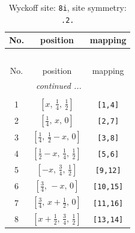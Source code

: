 \documentclass[fleqn,8pt]{jsarticle}
\begin{document}
\begin{longtable}{ccc}
\caption{Wyckoff site: {\tt 8i}, site symmetry: {\tt .2.}}
 \\
 \hline \hline
No. & position & mapping \\ \hline \endfirsthead

\multicolumn{2}{l}{\tablename\ \thetable{}} \\
 \hline \hline
No. & position & mapping \\ \hline \endhead

 \hline \hline
\multicolumn{2}{r}{\footnotesize\it continued ...} \\ \endfoot

 \hline \hline
\multicolumn{2}{r}{} \\ \endlastfoot

1 & $\left[ x,\, \frac{1}{4},\, \frac{1}{2} \right]$ & {\tt [1,4]} \\ \hline
2 & $\left[ \frac{1}{4},\, x,\, 0 \right]$ & {\tt [2,7]} \\ \hline
3 & $\left[ \frac{1}{4},\, \frac{1}{2} - x,\, 0 \right]$ & {\tt [3,8]} \\ \hline
4 & $\left[ \frac{1}{2} - x,\, \frac{1}{4},\, \frac{1}{2} \right]$ & {\tt [5,6]} \\ \hline
5 & $\left[ - x,\, \frac{3}{4},\, \frac{1}{2} \right]$ & {\tt [9,12]} \\ \hline
6 & $\left[ \frac{3}{4},\, - x,\, 0 \right]$ & {\tt [10,15]} \\ \hline
7 & $\left[ \frac{3}{4},\, x + \frac{1}{2},\, 0 \right]$ & {\tt [11,16]} \\ \hline
8 & $\left[ x + \frac{1}{2},\, \frac{3}{4},\, \frac{1}{2} \right]$ & {\tt [13,14]} \\
\end{longtable}
\renewcommand{\arraystretch}{1.2}
\end{document}
